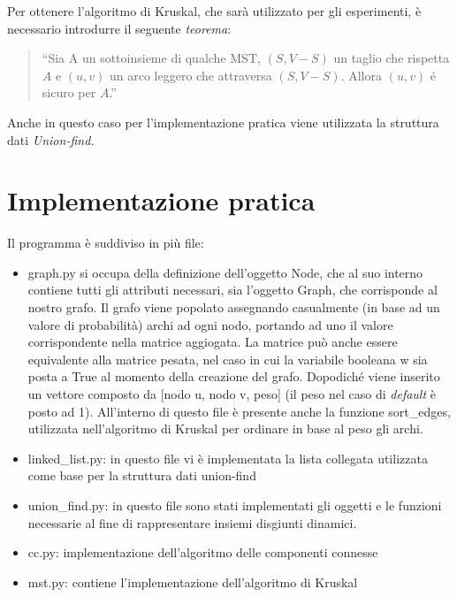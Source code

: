 \documentclass[
]{article}
\begin{document}
Per ottenere l'algoritmo di Kruskal, che sarà utilizzato per gli
esperimenti, è necessario introdurre il seguente \emph{teorema}:

\begin{quote}
``Sia A un sottoinsieme di qualche MST, \((S,V-S)\) un taglio che
rispetta \(A\) e \((u,v)\) un arco leggero che attraversa \((S,V-S)\).
Allora \((u,v)\) é sicuro per \(A\).''
\end{quote}

Anche in questo caso per l'implementazione pratica viene utilizzata la
struttura dati \emph{Union-find.}

\hypertarget{implementazione-pratica}{%
\section{Implementazione pratica}\label{implementazione-pratica}}

Il programma è suddiviso in più file:

\begin{itemize}
\item
  graph.py si occupa della definizione dell'oggetto Node, che al suo
  interno contiene tutti gli attributi necessari, sia l'oggetto Graph,
  che corrisponde al nostro grafo. Il grafo viene popolato assegnando
  casualmente (in base ad un valore di probabilità) archi ad ogni nodo,
  portando ad uno il valore corrispondente nella matrice aggiogata. La
  matrice può anche essere equivalente alla matrice pesata, nel caso in
  cui la variabile booleana w sia posta a True al momento della
  creazione del grafo. Dopodiché viene inserito un vettore composto da
  {[}nodo u, nodo v, peso{]} (il peso nel caso di \emph{default} è posto
  ad 1). All'interno di questo file è presente anche la funzione
  sort\_edges, utilizzata nell'algoritmo di Kruskal per ordinare in base
  al peso gli archi.
\item
  linked\_list.py: in questo file vi è implementata la lista collegata
  utilizzata come base per la struttura dati union-find
\item
  union\_find.py: in questo file sono stati implementati gli oggetti e
  le funzioni necessarie al fine di rappresentare insiemi disgiunti
  dinamici.
\item
  cc.py: implementazione dell'algoritmo delle componenti connesse
\item
  mst.py: contiene l'implementazione dell'algoritmo di Kruskal
\end{itemize}
\end{document}
